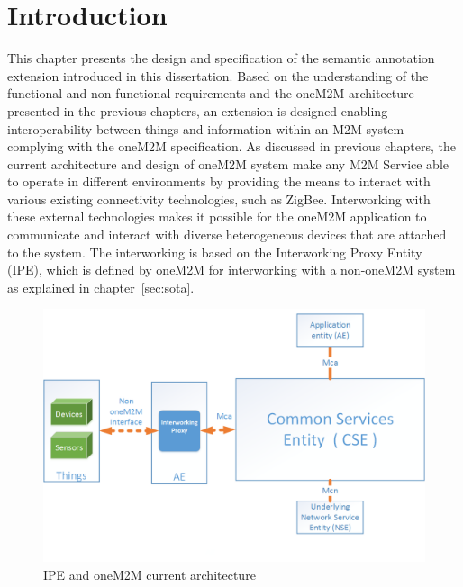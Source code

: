 \section{Introduction}
This chapter presents the design and specification of the semantic annotation extension introduced in this dissertation. Based on the understanding of the functional and non-functional requirements and the oneM2M architecture presented in the previous chapters, an extension is designed enabling interoperability between things and information within an M2M system complying with the oneM2M specification. As discussed in previous chapters, the current architecture and design of oneM2M system make any M2M Service able to operate in different environments by providing the means to interact with various existing connectivity technologies, such as ZigBee. Interworking with these external technologies makes it possible for the oneM2M application to communicate and interact with diverse heterogeneous devices that are attached to the system. The interworking is based on the Interworking Proxy Entity (IPE), which is defined by oneM2M for interworking with a non-oneM2M system as explained in chapter~\ref{sec:sota}. \par
\begin{figure}[htbp]
    \centering
    \includegraphics[width=1\textwidth]{resources/images/ini}
    \caption{IPE and oneM2M current architecture}\label{fig:contrib2:cc}
\end{figure}
